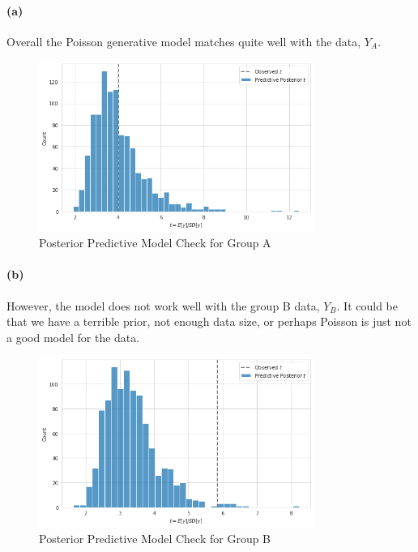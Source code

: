 \documentclass[11pt, letterpaper]{article}
\begin{document}
\paragraph{(a)}
Overall the Poisson generative model matches quite well with the data, $Y_A$. 

\begin{figure}[!h]
  \centering
  \includegraphics[width=0.8\textwidth]{4.3.a.png}
  \captionsetup{justification=centering}
  \caption{Posterior Predictive Model Check for Group A}
\end{figure}

\paragraph{(b)}
However, the model does not work well with the group B data, $Y_B$. It could be that we have a terrible prior,
not enough data size, or perhaps Poisson is just not a good model for the data.

\begin{figure}[!h]
  \centering
  \includegraphics[width=0.8\textwidth]{4.3.b.png}
  \captionsetup{justification=centering}
  \caption{Posterior Predictive Model Check for Group B}
\end{figure}
\newpage
\end{document}
